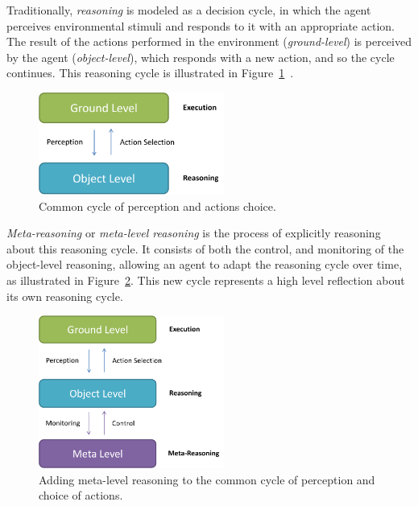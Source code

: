 Traditionally, \textit{reasoning} is modeled as a decision cycle, in which the agent perceives environmental stimuli and responds to it with an appropriate action. 
The result of the actions performed in the environment (\textit{ground-level})
is perceived by the agent (\textit{object-level}), which responds with a new action,
and so the cycle continues. 
This reasoning cycle is illustrated in Figure~\ref{fig:reasoning}~\cite{cox2007metareasoning}. 

\begin{figure}[ht]
\centering
\includegraphics[width=230px]{images/reasoning}
\caption{Common cycle of perception and actions choice.}
\label{fig:reasoning}
\end{figure}

\textit{Meta-reasoning} or \textit{meta-level reasoning} is the process of explicitly reasoning about this reasoning cycle. 
It consists of both the control, and monitoring of the object-level reasoning, allowing an agent to adapt the reasoning cycle over time, as illustrated in Figure~\ref{fig:metareasoning}. 
This new cycle represents a high level reflection about its own reasoning cycle. 

\begin{figure}[ht]
\centering
\includegraphics[width=230px]{images/metareasoning}
\caption{Adding meta-level reasoning to the common cycle of perception and choice of actions.}
\label{fig:metareasoning}
\end{figure}

